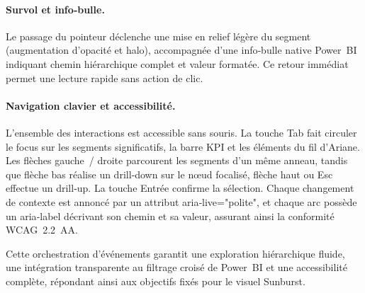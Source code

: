 \paragraph{Survol et info‑bulle.} Le passage du pointeur déclenche une mise en relief légère du segment (augmentation d’opacité et halo), accompagnée d’une info‑bulle native Power BI indiquant chemin hiérarchique complet et valeur formatée. Ce retour immédiat permet une lecture rapide sans action de clic.

\paragraph{Navigation clavier et accessibilité.} L’ensemble des interactions est accessible sans souris. La touche Tab fait circuler le focus sur les segments significatifs, la barre KPI et les éléments du fil d'Ariane. Les flèches gauche / droite parcourent les segments d’un même anneau, tandis que flèche bas réalise un drill‑down sur le nœud focalisé, flèche haut ou Esc effectue un drill‑up. La touche Entrée confirme la sélection. Chaque changement de contexte est annoncé par un attribut aria‑live="polite", et chaque arc possède un aria‑label décrivant son chemin et sa valeur, assurant ainsi la conformité WCAG 2.2 AA.

Cette orchestration d’événements garantit une exploration hiérarchique fluide, une intégration transparente au filtrage croisé de Power BI et une accessibilité complète, répondant ainsi aux objectifs fixés pour le visuel Sunburst.
